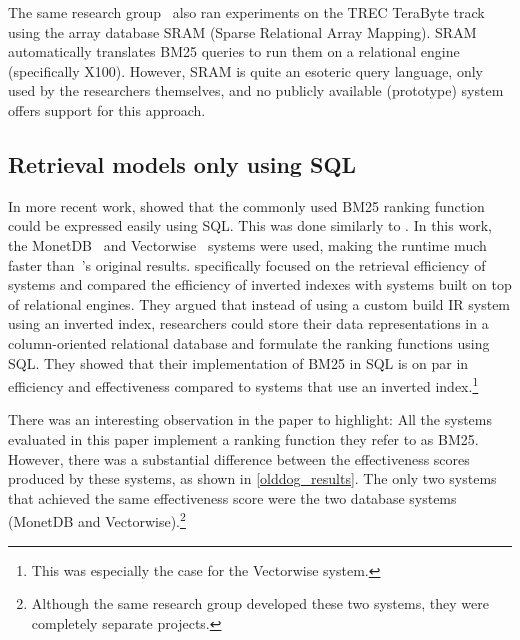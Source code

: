 The same research group~\citep{array-db} also ran experiments on the TREC TeraByte track using the array database SRAM (Sparse Relational Array Mapping). SRAM automatically translates BM25 queries to run them on a relational engine (specifically X100). However, SRAM is quite an esoteric query language, only used by the researchers themselves, and no publicly available (prototype) system offers support for this approach. 

\subsection{Retrieval models only using SQL}
In more recent work, \citet{OldDog} showed that the commonly used BM25 ranking function could be expressed easily using SQL. This was done similarly to \citet{PowerDB-IR}. In this work, the MonetDB~\citep{monet} and Vectorwise~\citep{vectorwise} systems were used, making the runtime much faster than~\citeauthor{PowerDB-IR}'s original results.  specifically focused on the retrieval efficiency of systems and compared the efficiency of inverted indexes with systems built on top of relational engines. They argued that instead of using a custom build IR system using an inverted index, researchers could store their data representations in a column-oriented relational database and formulate the ranking functions using SQL. They showed that their implementation of BM25 in SQL is on par in efficiency and effectiveness compared to systems that use an inverted index.\footnote{This was especially the case for the Vectorwise system.}  

There was an interesting observation in the paper to highlight: All the systems evaluated in this paper implement a ranking function they refer to as BM25. However, there was a substantial difference between the effectiveness scores produced by these systems, as shown in \cref{olddog_results}. The only two systems that achieved the same effectiveness score were the two database systems (MonetDB and Vectorwise).\footnote{Although the same research group developed these two systems, they were completely separate projects.}

